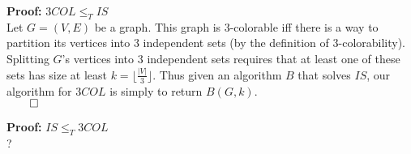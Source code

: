 \documentclass{amsart}
\begin{document}
\noindent
\textbf{Proof:} $3COL \le_T IS$\\

Let $G = (V, E)$ be a graph. This graph is 3-colorable iff there is a way to partition its vertices into 3 independent sets (by the definition of 3-colorability). Splitting $G$'s vertices into 3 independent sets requires that at least one of these sets has size at least $k = \lfloor \frac{|V|}{3} \rfloor$. Thus given an algorithm $B$ that solves $IS$, our algorithm for $3COL$ is simply to return $B(G, k)$.\\

\hfill$\qed$

\textbf{Proof:} $IS \le_T 3COL$\\

?
\end{document}
